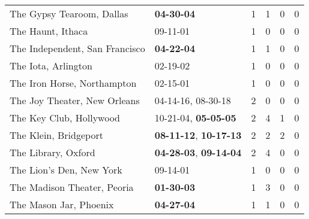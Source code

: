 \begin{longtable}{p{}p{}p{}p{}p{}p{}}
                                                    The Gypsy Tearoom, Dallas &                                       \textbf{04-30-04\textsuperscript{}} &  1 &  1 &  0 &  0 \\
                                                            The Haunt, Ithaca &                                                09-11-01\textsuperscript{} &  1 &  0 &  0 &  0 \\
                                               The Independent, San Francisco &                                       \textbf{04-22-04\textsuperscript{}} &  1 &  1 &  0 &  0 \\
                                                          The Iota, Arlington &                                                02-19-02\textsuperscript{} &  1 &  0 &  0 &  0 \\
                                                  The Iron Horse, Northampton &                                                02-15-01\textsuperscript{} &  1 &  0 &  0 &  0 \\
                                                The Joy  Theater, New Orleans &                    04-14-16\textsuperscript{}, 08-30-18\textsuperscript{} &  2 &  0 &  0 &  0 \\
                                                      The Key Club, Hollywood &           10-21-04\textsuperscript{}, \textbf{05-05-05\textsuperscript{}} &  2 &  4 &  1 &  0 \\
                                                        The Klein, Bridgeport &  \textbf{08-11-12\textsuperscript{}}, \textbf{10-17-13\textsuperscript{}} &  2 &  2 &  2 &  0 \\
                                                          The Library, Oxford &  \textbf{04-28-03\textsuperscript{}}, \textbf{09-14-04\textsuperscript{}} &  2 &  4 &  0 &  0 \\
                                                     The Lion's Den, New York &                                                09-14-01\textsuperscript{} &  1 &  0 &  0 &  0 \\
                                                  The Madison Theater, Peoria &                                       \textbf{01-30-03\textsuperscript{}} &  1 &  3 &  0 &  0 \\
                                                       The Mason Jar, Phoenix &                                       \textbf{04-27-04\textsuperscript{}} &  1 &  1 &  0 &  0 \\

\end{longtable}
